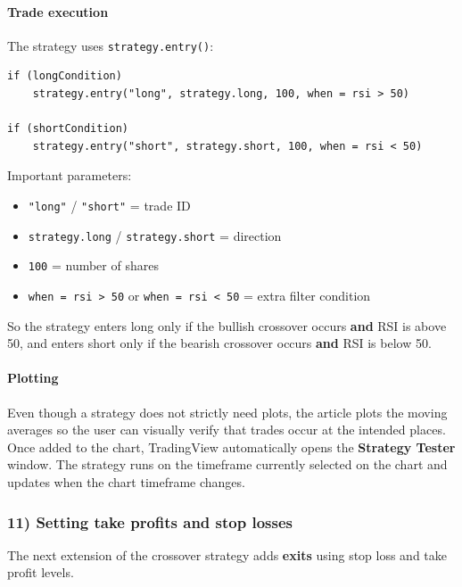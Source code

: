 \documentclass[12pt,openany]{book}
\begin{document}
\paragraph{Trade execution}

The strategy uses \texttt{strategy.entry()}:

\begin{Verbatim}[breaklines=true,breakanywhere=true,fontsize=\small]
if (longCondition)
    strategy.entry("long", strategy.long, 100, when = rsi > 50)

if (shortCondition)
    strategy.entry("short", strategy.short, 100, when = rsi < 50)
\end{Verbatim}

Important parameters:

\begin{itemize}[leftmargin=*]
    \item \texttt{"long"} / \texttt{"short"} = trade ID
    \item \texttt{strategy.long} / \texttt{strategy.short} = direction
    \item \texttt{100} = number of shares
    \item \texttt{when = rsi > 50} or \texttt{when = rsi < 50} = extra filter condition
\end{itemize}

So the strategy enters long only if the bullish crossover occurs \textbf{and} RSI is above 50, and enters short only if the bearish crossover occurs \textbf{and} RSI is below 50.

\paragraph{Plotting}

Even though a strategy does not strictly need plots, the article plots the moving averages so the user can visually verify that trades occur at the intended places. Once added to the chart, TradingView automatically opens the \textbf{Strategy Tester} window. The strategy runs on the timeframe currently selected on the chart and updates when the chart timeframe changes.

\subsubsection{11) Setting take profits and stop losses}

The next extension of the crossover strategy adds \textbf{exits} using stop loss and take profit levels.
\end{document}
